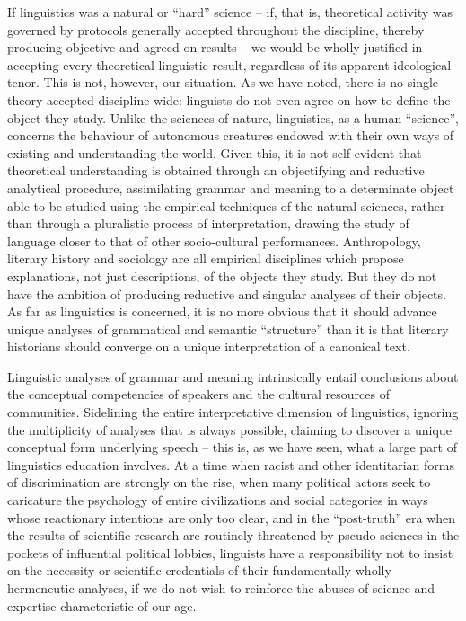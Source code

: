 \documentclass[output=paper]{langscibook}
\begin{document}
If linguistics was a natural or ``hard'' science -- if, that is, theoretical activity was governed by protocols generally accepted throughout the discipline, thereby producing objective and agreed-on results -- we would be wholly justified in accepting every theoretical linguistic result, regardless of its apparent ideological tenor. This is not, however, our situation. As we have noted, there is no single theory accepted discipline-wide: linguists do not even agree on how to define the object they study. Unlike the sciences of nature, linguistics, as a human ``science'', concerns the behaviour of autonomous creatures endowed with their own ways of existing and understanding the world. Given this, it is not self-evident that theoretical understanding is obtained through an objectifying and reductive analytical procedure, assimilating grammar and meaning to a determinate object able to be studied using the empirical techniques of the natural sciences, rather than through a pluralistic process of interpretation, drawing the study of language closer to that of other socio-cultural performances. Anthropology, literary history and sociology are all empirical disciplines which propose explanations, not just descriptions, of the objects they study. But they do not have the ambition of producing reductive and singular analyses of their objects. As far as linguistics is concerned, it is no more obvious that it should advance unique analyses of grammatical and semantic ``structure'' than it is that literary historians should converge on a unique interpretation of a canonical text.

Linguistic analyses of grammar and meaning intrinsically entail conclusions about the conceptual competencies of speakers and the cultural resources of communities. Sidelining the entire interpretative dimension of linguistics, ignoring the multiplicity of analyses that is always possible, claiming to discover a unique conceptual form underlying speech -- this is, as we have seen, what a large part of linguistics education involves. At a time when racist and other identitarian forms of discrimination are strongly on the rise, when many political actors seek to caricature the psychology of entire civilizations and social categories in ways whose reactionary intentions are only too clear, and in the ``post-truth'' era when the results of scientific research are routinely threatened by pseudo-sciences in the pockets of influential political lobbies, linguists have a responsibility not to insist on the necessity or scientific credentials of their fundamentally wholly hermeneutic analyses, if we do not wish to reinforce the abuses of science and expertise characteristic of our age.
\end{document}
